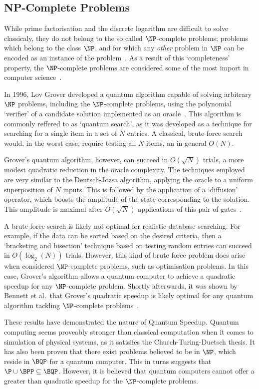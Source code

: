 \documentclass{standalone}
\begin{document}
\subsection{NP-Complete Problems}\label{sec:notNP}
While prime factorisation and the discrete logarithm are difficult to solve classicaly, they do not belong to the so called $\NP$-complete problems; problems which belong to the class $\NP$, and for which any \emph{other} problem in $\NP$ can be encoded as an instance of the problem~\cite{ComplexityZoo}. As a result of this `completeness' property, the $\NP$-complete problems are considered some of the most import in computer science~\cite{Bennett1997}.
\par
In 1996, Lov Grover developed a quantum algorithm capable of solving arbitrary $\NP$ problems, including the $\NP$-complete problems, using the polynomial `verifier' of a candidate solution implemented as an oracle~\cite{Grover1996}. This algorithm is commonly reffered to as `quantum search', as it was developed as a technique for searching for a single item in a set of $N$ entries. A classical, brute-force search would, in the worst case, require testing all $N$ items, an in general $O(N)$. 
\par
Grover's quantum algorithm, however, can succeed in $O(\sqrt{N})$ trials, a more modest quadratic reduction in the oracle complexity. The techniques employed are very similar to the Deutsch-Jozsa algorithm, applying the oracle to a uniform superposition of $N$ inputs. This is followed by the application of a `diffusion' operator, which boosts the amplitude of the state corresponding to the solution. This amplitude is maximal after $O(\sqrt{N})$ applications of this pair of gates~\cite{Grover1996}.
\par
A brute-force search is likely not optimal for realistic database searching. For example, if the data can be sorted based on the desired criteria, then a `bracketing and bisection' technique based on testing random entries can succeed in $O(\log_{2}(N))$ trials. However, this kind of brute force problem does arise when considered $\NP$-complete problems, such as optimisation problems. In this case, Grover's algorithm allows a quantum computer to achieve a quadratic speedup for any $\NP$-complete problem. Shortly afterwards, it was shown by Bennett et al.\ that Grover's quadratic speedup is likely optimal for any quantum algorithm tackling $\NP$-complete problems~\cite{Bennett1997}.
\par
These results have demonstrated the nature of Quantum Speedup. Quantum computing seems proveably stronger than classical computation when it comes to simulation of physical systems, as it satisifes the Church-Turing-Duetsch thesis. It has also been proven that there exist problems believed to be in $\NP$, which reside in $\BQP$ for a quantum computer. This in turns suggests that$\P\cup\BPP\subseteq\BQP$. However, it is believed that quantum computers cannot offer a greater than quadratic speedup for the $\NP$-complete problems. 
\end{document}
